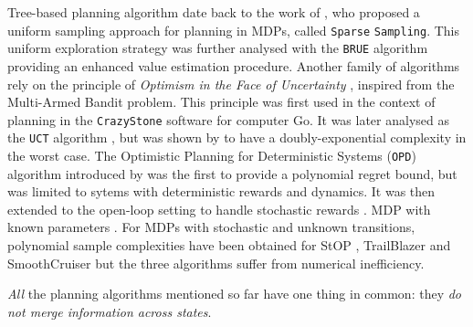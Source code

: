 \documentclass[runningheads]{llncs}
\begin{document}
Tree-based planning algorithm date back to the work of \citet{Kearns02SS}, who proposed a uniform sampling approach for planning in MDPs, called \texttt{Sparse} \texttt{Sampling}. This uniform exploration strategy was further analysed with the \texttt{BRUE} algorithm
\citep{Feldman14BRUE} providing an enhanced value estimation procedure. Another family of algorithms rely on the principle of \emph{Optimism in the Face of Uncertainty} \citep[surveyed by][]{SurveyRemiMCTS}, inspired from the Multi-Armed Bandit problem. This principle was first used in the context of planning in the \texttt{CrazyStone} software \citep{Coulom2006} for computer Go. It was later analysed as the \texttt{UCT} algorithm \citep{Kocsis06UCT}, but was shown by \citet{Coquelin2007} to have a doubly-exponential complexity in the worst case. The {Optimistic Planning for Deterministic Systems} (\texttt{OPD}) algorithm introduced by \citet{hren2008optimistic} was the first to provide a polynomial regret bound, but was limited to sytems with deterministic rewards and dynamics. It was then extended to the {open-loop} setting to handle stochastic rewards \citep{bubeck2010open,leurent2019practical}.
MDP with known parameters \citep{busoniu2012optimistic}.
For MDPs with stochastic and unknown transitions, polynomial sample complexities have been obtained for StOP \citep{STOP14}, TrailBlazer \citep{TrailBlazer16} and SmoothCruiser \citep{SmoothCruiser19} but the three algorithms suffer from numerical inefficiency.



\emph{All} the planning algorithms mentioned so far have one thing in common: they \emph{do not merge information across states}.
\end{document}
